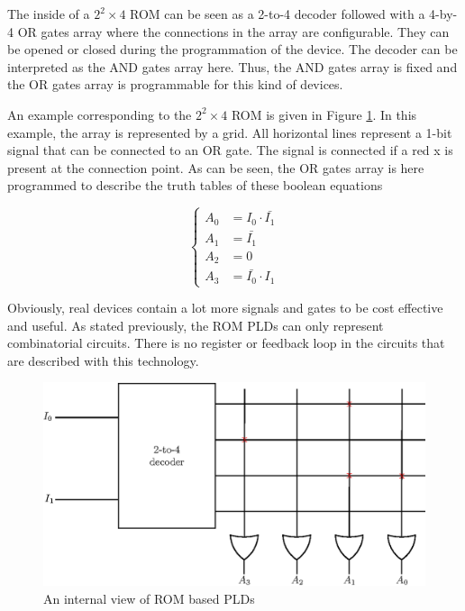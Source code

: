 The inside of a $2^2 \times 4$ ROM can be seen as a 2-to-4 decoder followed with a 4-by-4 OR gates 
array where the connections in the array are configurable. They can be opened or closed during the
programmation of the device. The decoder can be interpreted as the AND gates array here. Thus, the
AND gates array is fixed and the OR gates array is programmable for this kind of devices.

An example corresponding to the $2^2 \times 4$ ROM is given in Figure \ref{fig:fpga/pld_rom_internal}.
In this example, the array is represented by a grid. All horizontal lines represent a 1-bit signal
that can be connected to an OR gate. The signal is connected if a red x is present at the connection
point. As can be seen, the OR gates array is here programmed to describe the truth tables of these 
boolean equations

\begin{equation*}
    \begin{cases}
        A_0& = I_0 \cdot \bar{I_1} \\
        A_1& = \bar{I_1} \\
        A_2& = 0 \\
        A_3& = \bar{I_0} \cdot I_1
    \end{cases}
\end{equation*}

Obviously, real devices contain a lot more signals and gates to be cost effective and useful. 
As stated previously, the ROM PLDs can only represent combinatorial circuits. There is no register
or feedback loop in the circuits that are described with this technology.

\begin{figure}[H]
    \centering
    \includegraphics[scale=0.8]{Chapter1-Hardware/res/pld_rom_internal}
    \caption{An internal view of ROM based PLDs}
    \label{fig:fpga/pld_rom_internal}
\end{figure}

